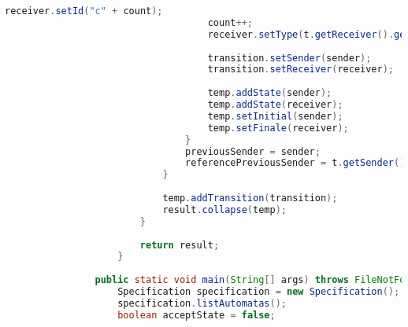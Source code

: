 \begin{lstlisting}[language=java, caption={példa unit teszteset.},captionpos=b]
									receiver.setId("c" + count);
									count++;
									receiver.setType(t.getReceiver().getType());
				
									transition.setSender(sender);
									transition.setReceiver(receiver);
				
									temp.addState(sender);
									temp.addState(receiver);
									temp.setInitial(sender);
									temp.setFinale(receiver);
								}
								previousSender = sender;
								referencePreviousSender = t.getSender();
							}
				
							temp.addTransition(transition);
							result.collapse(temp);
						}
				
						return result;
					}
				
				public static void main(String[] args) throws FileNotFoundException, UnsupportedEncodingException{
					Specification specification = new Specification();
					specification.listAutomatas();
					boolean acceptState = false;
					

\end{lstlisting}

